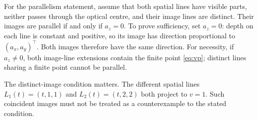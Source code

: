 \documentclass[12pt,a4paper,twoside]{article}
\begin{document}
For the parallelism statement, assume that both spatial lines have visible
parts, neither passes through the optical centre, and their image lines are
distinct. Their images are parallel if and only if $a_z=0$.
To prove sufficiency, set $a_z=0$: depth on each line is constant and positive,
so its image has direction proportional to $(a_x,a_y)^\top$. Both images
therefore have the same direction. For necessity, if $a_z\ne0$, both image-line
extensions contain the finite point \eqref{eq:vp}; distinct lines sharing a
finite point cannot be parallel.

The distinct-image condition matters. The different spatial lines
$L_1(t)=(t,1,1)$ and $L_2(t)=(t,2,2)$ both project to $v=1$. Such coincident
images must not be treated as a counterexample to the stated condition.
\end{document}
